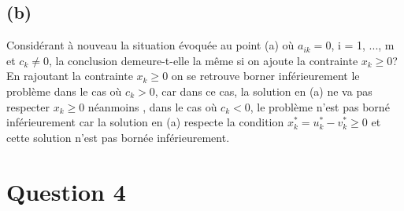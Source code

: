 \documentclass{article}
\begin{document}
\subsection*{(b)}
\begin{spacing}{1.2}
\noindent Considérant à nouveau la situation évoquée au point (a) où $a_{ik} = 0$, i = 1, ..., m et $c_k \neq 0$, la conclusion demeure-t-elle la même si on ajoute la contrainte $x_k \geq 0$? 
\\

\noindent En rajoutant la contrainte $x_k \geq 0$ on se retrouve borner inférieurement le problème dans le cas où $c_k > 0$, car dans ce cas, la solution en (a) ne va pas respecter $x_k \geq 0$ néanmoins , dans le cas où $c_k < 0$, le problème n'est pas borné inférieurement car la solution en (a) respecte la condition $x^*_k = u^*_k-v^*_k \geq 0$ et cette solution n'est pas bornée inférieurement.
\end{spacing}

\pagebreak

\section*{Question 4}
\end{document}
